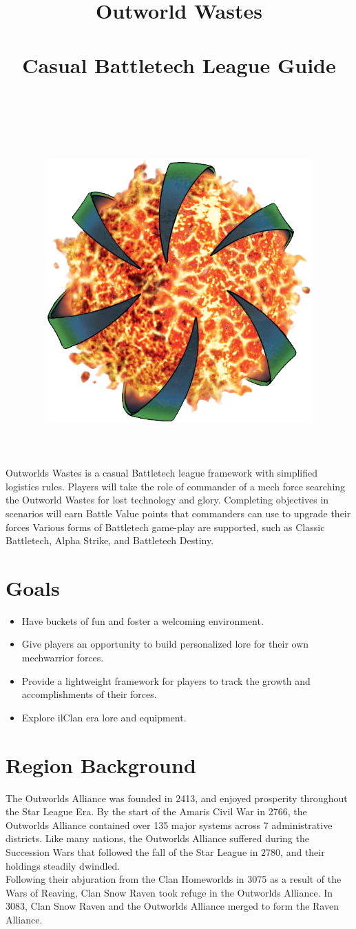 \documentclass[UTF8]{article}
\title{
  Outworld Wastes\\
  ~\\
  \large Casual Battletech League Guide \\
  ~\\
  ~\\
  ~\\
  \includegraphics[width=4in]{img/Outworlds_Alliance.png}
}
\author{}
\date{}
\begin{document}
\maketitle

\newpage

Outworlds Wastes is a casual Battletech league framework with simplified logistics rules.
Players will take the role of commander of a mech force searching the Outworld Wastes for lost technology and glory.
Completing objectives in scenarios will earn Battle Value points that commanders can use to upgrade their forces
Various forms of Battletech game-play are supported, such as Classic Battletech, Alpha Strike, and Battletech Destiny.

\section*{Goals}

\begin{itemize}

\item Have buckets of fun and foster a welcoming environment.

\item Give players an opportunity to build personalized lore for their own mechwarrior forces.

\item Provide a lightweight framework for players to track the growth and accomplishments of their forces.

\item Explore ilClan era lore and equipment.

\end{itemize}

\newpage

\section{Region Background}

The Outworlds Alliance was founded in 2413, and enjoyed prosperity throughout the Star League Era.
By the start of the Amaris Civil War in 2766, the Outworlds Alliance contained over 135 major systems across 7 administrative districts.
Like many nations, the Outworlds Alliance suffered during the Succession Wars that followed the fall of the Star League in 2780, and their holdings steadily dwindled.\\

Following their abjuration from the Clan Homeworlds in 3075 as a result of the Wars of Reaving, Clan Snow Raven took refuge in the Outworlds Alliance.
In 3083, Clan Snow Raven and the Outworlds Alliance merged to form the Raven Alliance.\\
\end{document}

